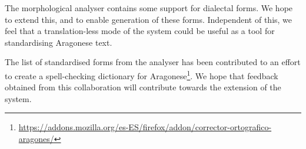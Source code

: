 \documentclass[10pt, a4paper]{article}
\begin{document}
  The morphological analyser contains some support for dialectal forms. We hope to extend this, and to enable generation of these forms. Independent of this, we feel that a translation-less mode of the system could be useful as a tool for standardising Aragonese text.
  
  The list of standardised forms from the analyser has been contributed to an effort to create a spell-checking dictionary for Aragonese\footnote{\url{https://addons.mozilla.org/es-ES/firefox/addon/corrector-ortografico-aragones/}}. We hope that feedback obtained from this collaboration will contribute towards the extension of the system.



  
\end{document}

